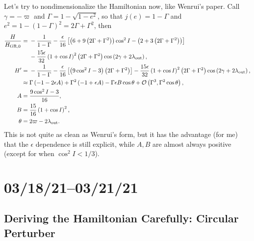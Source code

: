 \documentclass[10pt,
        usenames, %
        dvipsnames %
    ]{article}
\newcommand*{\p}[1]{\left(#1\right)}
\newcommand*{\s}[1]{\left[#1\right]}
\begin{document}
Let's try to nondimensionalize the Hamiltonian now, like Wenrui's paper. Call
$\gamma = -\varpi$ and $\Gamma = 1 - \sqrt{1 - e^2}$, so that $j(e) = 1 -
\Gamma$ and $e^2 = 1 - \p{1 - \Gamma}^2 = 2\Gamma + \Gamma^2$, then
\begin{align}
    \frac{H}{H_{\rm GR, 0}} ={}&
        -\frac{1}{1 - \Gamma} - \frac{\epsilon}{16}
            \s{\p{6 + 9\p{2\Gamma + \Gamma^2}}\cos^2 I
                - \p{2 + 3\p{2\Gamma + \Gamma^2}}}\nonumber\\
            &- \frac{15\epsilon}{32}\p{1 + \cos I}^2 \p{2\Gamma + \Gamma^2}
                \cos\p{2\gamma + 2\lambda_{\rm out}},\\
    H' ={}& -\frac{1}{1 - \Gamma} - \frac{\epsilon}{16}\s{
        \p{9\cos^2 I - 3}\p{2\Gamma + \Gamma^2}}
        - \frac{15\epsilon}{32}\p{1 + \cos I}^2
            \p{2\Gamma + \Gamma^2}\cos\p{2\gamma + 2\lambda_{\rm out}},\\
        \approx{}&
            \Gamma\p{-1 - 2\epsilon A}
            + \Gamma^2\p{-1 + \epsilon A}
            - \Gamma \epsilon B\cos \theta
            + \mathcal{O}\p{\Gamma^3, \Gamma^2 \cos \theta},\\
    A ={}& \frac{9\cos^2 I - 3}{16},\\
    B ={}& \frac{15}{16}\p{1 + \cos I}^2,\\
    \theta ={}& 2\varpi - 2\lambda_{\rm out}.
\end{align}
This is not quite as clean as Wenrui's form, but it has the advantage (for me)
that the $\epsilon$ dependence is still explicit, while $A, B$ are almost always
positive (except for when $\cos^2 I < 1/3$).

\section{03/18/21--03/21/21}

\subsection{Deriving the Hamiltonian Carefully: Circular Perturber}
\end{document}
